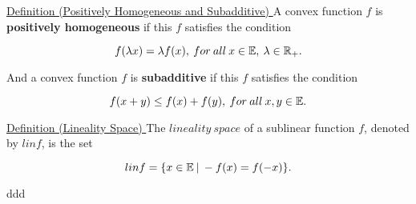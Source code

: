 \documentclass[a4paper,11pt]{jsarticle}
\begin{document}
\begin{itembox}[l]{\underline{Definition (Positively Homogeneous and Subadditive) }}
  A convex function $f$ is \textbf{positively homogeneous} if this $f$ satisfies the condition

  \begin{equation}
    f(\lambda x) = \lambda f(x),\:for \:all\: x \in{\mathbb{E}},\: \lambda \in{\mathbb{R}}_+. \notag
  \end{equation}

  And a convex function $f$ is \textbf{subadditive} if this $f$ satisfies the condition

  \begin{equation}
    f( x + y) \leq f(x) + f(y),\:for \:all\: x, y \in{\mathbb{E}}. \notag
  \end{equation}

\end{itembox}

\begin{itembox}[l]{\underline{Definition (Lineality Space) }}
  The $lineality\:space$ of a
  sublinear function $f$, denoted by $lin f$, is the set

  \begin{equation}
    lin f = \{x \in \mathbb{E}\:|\:-f(x) = f(-x)\}. \notag
  \end{equation}
\end{itembox}
ddd
\end{document}
